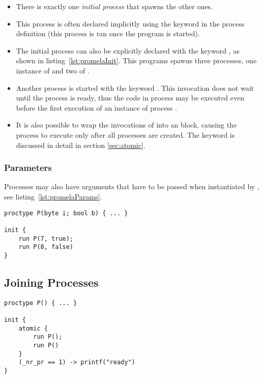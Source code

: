 			\begin{itemize}
				\item There is exactly one \textit{initial process} that spawns the other ones.
				\item This process is often declared implicitly using the keyword  in the process definition (this process is ran once the program is started).
				\item The initial process can also be explicitly declared with the keyword , as shown in listing~\ref{lst:promelaInit}. This programs spawns three processes, one instance of  and two of .
				\item Another process is started with the keyword . This invocation does not wait until the process is ready, thus the code in process  may be executed even before the first execution of an instance of process .
				\item It is also possible to wrap the invocations of  into an  block, causing the process to execute only after all processes are created. The keyword  is discussed in detail in section \ref{sec:atomic}.
			\end{itemize}
		
			\subsubsection{Parameters}
				Processes may also have arguments that have to be passed when instantiated by , see listing~\ref{lst:promelaParams}.
				
				\begin{lstlisting}[caption = { PROMELA Processes with Parameters }, label = lst:promelaParams, language = PROMELA]
proctype P(byte i; bool b) { ... }

init {
	run P(7, true);
	run P(8, false)
}
				\end{lstlisting}

		\subsection{Joining Processes}
			\begin{lstlisting}[caption = { Joining PROMELA Processes }, label = lst:promelaJoin, language = PROMELA]
proctype P() { ... }

init {
	atomic {
		run P();
		run P()
	}
	(_nr_pr == 1) -> printf("ready")
}
			\end{lstlisting}
		
